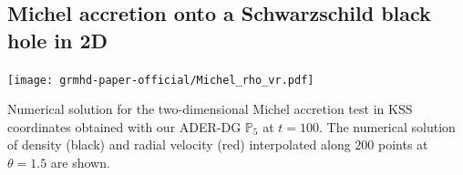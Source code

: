 \subsection{Michel accretion onto a Schwarzschild black hole in 2D}
\label{sec:conv}
%
\begin{marginfigure}
	\hspace*{-.5cm}
    \texttt{[image: grmhd-paper-official/Michel\_rho\_vr.pdf]}
    \caption[
      Michel accretion, 
    ]{ Numerical solution for the
      two-dimensional Michel accretion test in KSS coordinates obtained
      with our ADER-DG $\mathbb{P}_5$ at $t=100$. The numerical solution of
      density (black) and radial velocity (red) interpolated along $200$ points at
      $\theta=1.5$ are shown.}  \label{fig:Michel}
\end{marginfigure}
